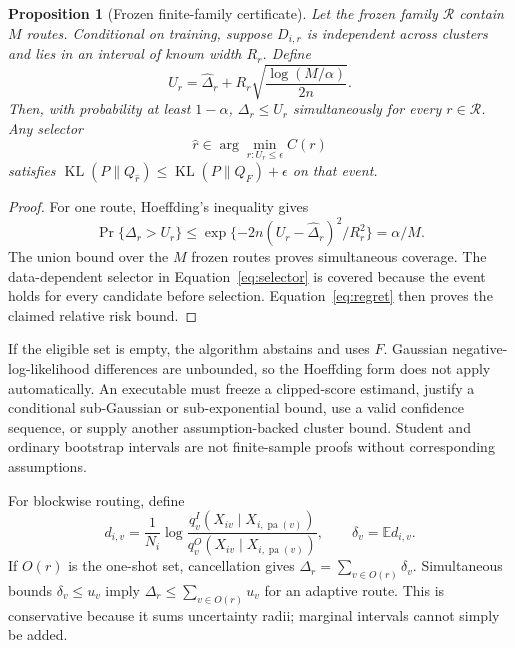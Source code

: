 \documentclass[11pt]{article}
\newtheorem{proposition}{Proposition}[section]
\DeclareMathOperator{\KL}{KL}
\newcommand{\E}{\mathbb E}
\newcommand{\cR}{\mathcal R}
\begin{document}
\begin{proposition}[Frozen finite-family certificate]
Let the frozen family $\cR$ contain $M$ routes.  Conditional on training, suppose $D_{i,r}$ is independent across clusters and lies in an interval of known width $R_r$.  Define
\begin{equation}
 U_r=\widehat\Delta_r+R_r\sqrt{\frac{\log(M/\alpha)}{2n}}.
 \label{eq:upper}
\end{equation}
Then, with probability at least $1-\alpha$, $\Delta_r\le U_r$ simultaneously for every $r\in\cR$.  Any selector
\begin{equation}
 \widehat r\in\arg\min_{r:U_r\le\epsilon}C(r)
 \label{eq:selector}
\end{equation}
satisfies $\KL(P\|Q_{\widehat r})\le\KL(P\|Q_F)+\epsilon$ on that event.
\end{proposition}

\begin{proof}
For one route, Hoeffding's inequality gives
\[
 \Pr\{\Delta_r>U_r\}
 \le \exp\{-2n(U_r-\widehat\Delta_r)^2/R_r^2\}=\alpha/M.
\]
The union bound over the $M$ frozen routes proves simultaneous coverage.  The data-dependent selector in Equation~\eqref{eq:selector} is covered because the event holds for every candidate before selection.  Equation~\eqref{eq:regret} then proves the claimed relative risk bound.
\end{proof}

If the eligible set is empty, the algorithm abstains and uses $F$.  Gaussian negative-log-likelihood differences are unbounded, so the Hoeffding form does not apply automatically.  An executable must freeze a clipped-score estimand, justify a conditional sub-Gaussian or sub-exponential bound, use a valid confidence sequence, or supply another assumption-backed cluster bound.  Student and ordinary bootstrap intervals are not finite-sample proofs without corresponding assumptions.

For blockwise routing, define
\begin{equation}
 d_{i,v}=\frac{1}{N_i}\log
 \frac{q_v^I(X_{iv}\mid X_{i,\operatorname{pa}(v)})}
 {q_v^O(X_{iv}\mid X_{i,\operatorname{pa}(v)})},
 \qquad \delta_v=\E d_{i,v}.
\end{equation}
If $O(r)$ is the one-shot set, cancellation gives $\Delta_r=\sum_{v\in O(r)}\delta_v$.  Simultaneous bounds $\delta_v\le u_v$ imply $\Delta_r\le\sum_{v\in O(r)}u_v$ for an adaptive route.  This is conservative because it sums uncertainty radii; marginal intervals cannot simply be added.
\end{document}
